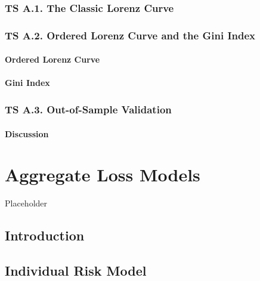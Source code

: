 \documentclass[]{book}
\theoremstyle{definition}
\theoremstyle{definition}
\theoremstyle{definition}
\theoremstyle{remark}
\begin{document}
\subsection*{TS A.1. The Classic Lorenz
Curve}\label{ts-a.1.-the-classic-lorenz-curve}

\subsection*{TS A.2. Ordered Lorenz Curve and the Gini
Index}\label{ts-a.2.-ordered-lorenz-curve-and-the-gini-index}

\subsubsection*{Ordered Lorenz Curve}\label{ordered-lorenz-curve}

\subsubsection*{Gini Index}\label{gini-index}

\subsection*{TS A.3. Out-of-Sample
Validation}\label{ts-a.3.-out-of-sample-validation}

\subsubsection*{Discussion}\label{discussion}

\chapter{Aggregate Loss Models}\label{C:AggLossModels}

Placeholder

\section{Introduction}\label{introduction}

\section{Individual Risk Model}\label{individual-risk-model}
\end{document}
